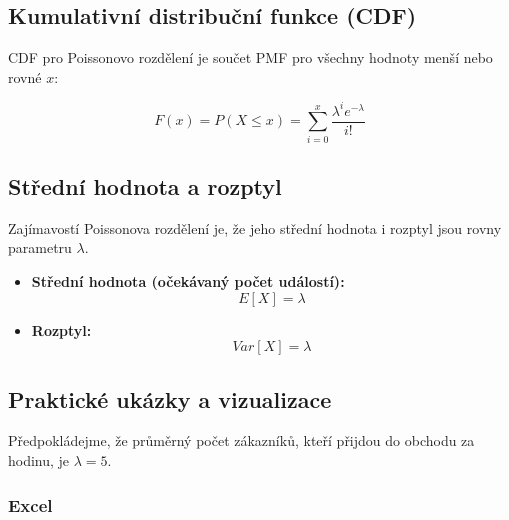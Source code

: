 \documentclass[
  czech,
  11pt,
  letterpaper,
  DIV=11,
  numbers=noendperiod]{scrreprt}
\providecommand{\tightlist}{%
  \setlength{\itemsep}{0pt}\setlength{\parskip}{0pt}}
\begin{document}
\subsection{Kumulativní distribuční funkce
(CDF)}\label{kumulativnuxed-distribuux10dnuxed-funkce-cdf-2}

CDF pro Poissonovo rozdělení je součet PMF pro všechny hodnoty menší
nebo rovné \(x\):

\[ F(x) = P(X \le x) = \sum_{i=0}^{x} \frac{\lambda^i e^{-\lambda}}{i!} \]

\subsection{Střední hodnota a
rozptyl}\label{stux159ednuxed-hodnota-a-rozptyl-1}

Zajímavostí Poissonova rozdělení je, že jeho střední hodnota i rozptyl
jsou rovny parametru \(\lambda\).

\begin{itemize}
\tightlist
\item
  \textbf{Střední hodnota (očekávaný počet událostí):}
  \[ E[X] = \lambda \]
\item
  \textbf{Rozptyl:} \[ Var[X] = \lambda \]
\end{itemize}

\subsection{Praktické ukázky a
vizualizace}\label{praktickuxe9-ukuxe1zky-a-vizualizace-1}

Předpokládejme, že průměrný počet zákazníků, kteří přijdou do obchodu za
hodinu, je \textbf{\(\lambda=5\)}.

\subsubsection*{Excel}\label{excel-1}
\end{document}
